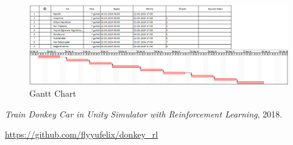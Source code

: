 \documentclass{article}
\begin{document}
\newpage

\begin{landscape}
\thispagestyle{empty}
    \begin{figure}
     \centering
  \includegraphics[width=1.8\textwidth]{Merged.png}\centering %
  \caption{Gantt Chart}
  \label{fig:resim_etiketi}
\end{figure}

\end{landscape}



\newpage




\textit{Train Donkey Car in Unity Simulator with Reinforcement Learning}, 2018.
\par
\url{https://github.com/flyyufelix/donkey_rl}
\end{document}
